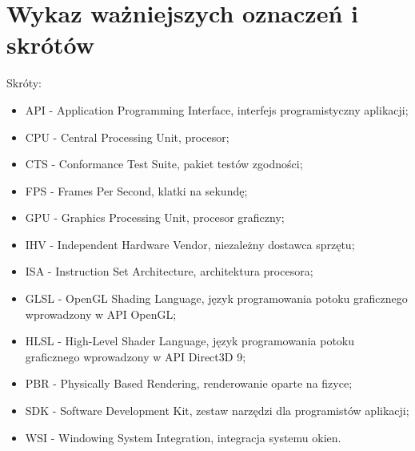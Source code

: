 \chapter*{Wykaz ważniejszych oznaczeń i skrótów}

Skróty:
\begin{itemize}
\item{API} - Application Programming Interface, interfejs programistyczny aplikacji;
\item{CPU} - Central Processing Unit, procesor;
\item{CTS} - Conformance Test Suite, pakiet testów zgodności;
\item{FPS} - Frames Per Second, klatki na sekundę;
\item{GPU} - Graphics Processing Unit, procesor graficzny;
\item{IHV} - Independent Hardware Vendor, niezależny dostawca sprzętu;
\item{ISA} - Instruction Set Architecture, architektura procesora;
\item{GLSL} - OpenGL Shading Language, język programowania potoku graficznego wprowadzony w API OpenGL;
\item{HLSL} - High-Level Shader Language, język programowania potoku graficznego wprowadzony w API Direct3D 9;
\item{PBR} - Physically Based Rendering, renderowanie oparte na fizyce;
\item{SDK} - Software Development Kit, zestaw narzędzi dla programistów aplikacji;
\item{WSI} -  Windowing System Integration, integracja systemu okien.
\end{itemize}